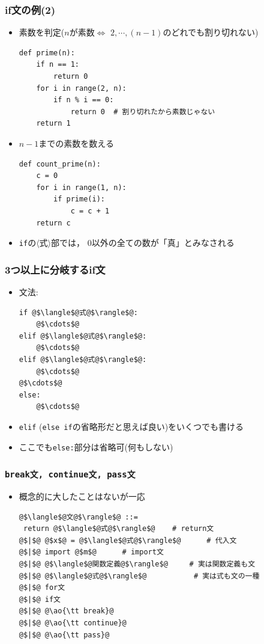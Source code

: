\documentclass[10pt,dvipdfmx]{beamer}
\newcommand{\ao}[1]{{\color{blue}#1}}
\begin{document}
\begin{frame}[fragile]
\frametitle{if文の例(2)}
\begin{itemize}
\item 素数を判定($n$が素数$\iff$ $2, \cdots , (n - 1)$のどれでも割り切れない)
\begin{lstlisting}
def prime(n):
    if n == 1:
        return 0
    for i in range(2, n):
        if n % i == 0:
            return 0  # 割り切れたから素数じゃない
    return 1
\end{lstlisting}

\item $n-1$までの素数を数える
\begin{lstlisting}
def count_prime(n):
    c = 0
    for i in range(1, n):
        if prime(i):
            c = c + 1
    return c
\end{lstlisting}

\item {\tt if}の$\langle$式$\rangle$部では，
  0以外の全ての数が「真」とみなされる

\end{itemize}
\end{frame}


\begin{frame}[fragile]
\frametitle{3つ以上に分岐するif文}
\begin{itemize}
\item 文法:
\begin{lstlisting}
if @$\langle$@式@$\rangle$@:
    @$\cdots$@
elif @$\langle$@式@$\rangle$@:
    @$\cdots$@
elif @$\langle$@式@$\rangle$@:
    @$\cdots$@
@$\cdots$@
else:
    @$\cdots$@
\end{lstlisting}
\item {\tt elif} ({\tt else if}の省略形だと思えば良い)をいくつでも書ける
\item ここでも{\tt else:}部分は省略可(何もしない)
\end{itemize}
\end{frame}


\begin{frame}[fragile]
\frametitle{{\tt break文, continue文, pass文}}

\begin{itemize}
\item 概念的に大したことはないが一応

\begin{lstlisting}
@$\langle$@文@$\rangle$@ ::=
 return @$\langle$@式@$\rangle$@    # return文
@$|$@ @$x$@ = @$\langle$@式@$\rangle$@      # 代入文
@$|$@ import @$m$@      # import文
@$|$@ @$\langle$@関数定義@$\rangle$@     # 実は関数定義も文
@$|$@ @$\langle$@式@$\rangle$@           # 実は式も文の一種
@$|$@ for文
@$|$@ if文
@$|$@ @\ao{\tt break}@
@$|$@ @\ao{\tt continue}@
@$|$@ @\ao{\tt pass}@
\end{lstlisting}
\end{itemize}

\end{frame}
\end{document}

